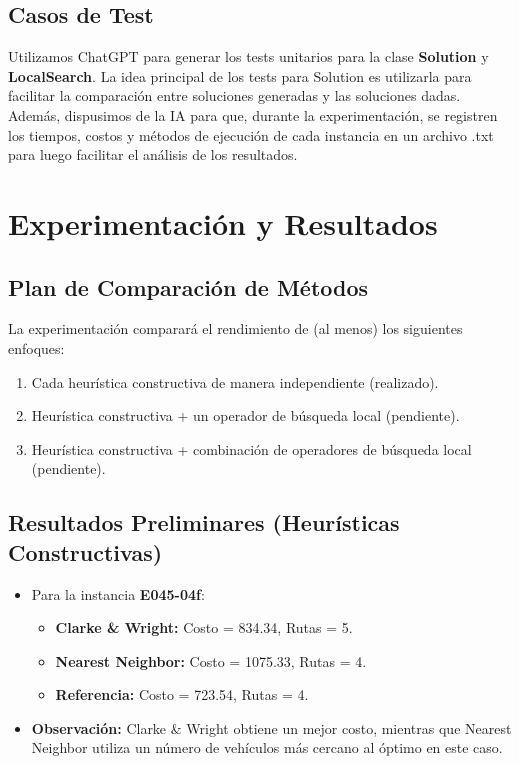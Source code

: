 \documentclass[a4paper,12pt]{article}
\begin{document}
\subsection{Casos de Test}
Utilizamos ChatGPT para generar los tests unitarios para la clase \textbf{Solution} y \textbf{LocalSearch}. La idea principal de los tests para Solution es utilizarla para facilitar la comparación entre soluciones generadas y las soluciones dadas.
Además, dispusimos de la IA para que, durante la experimentación, se registren los tiempos, costos y métodos de ejecución de cada instancia en un archivo .txt para luego facilitar el análisis de los resultados.

\section{Experimentación y Resultados}

\subsection{Plan de Comparación de Métodos}
La experimentación comparará el rendimiento de (al menos) los siguientes enfoques:
\begin{enumerate}
    \item Cada heurística constructiva de manera independiente (realizado).
    \item Heurística constructiva + un operador de búsqueda local (pendiente).
    \item Heurística constructiva + combinación de operadores de búsqueda local (pendiente).
\end{enumerate}

\subsection{Resultados Preliminares (Heurísticas Constructivas)}
\begin{itemize}
    \item Para la instancia \textbf{E045-04f}:
    \begin{itemize}
        \item \textbf{Clarke \& Wright:} Costo = 834.34, Rutas = 5.
        \item \textbf{Nearest Neighbor:} Costo = 1075.33, Rutas = 4.
        \item \textbf{Referencia:} Costo = 723.54, Rutas = 4.
    \end{itemize}
    \item \textbf{Observación:} Clarke \& Wright obtiene un mejor costo, mientras que Nearest Neighbor utiliza un número de vehículos más cercano al óptimo en este caso.
\end{itemize}
\end{document}

